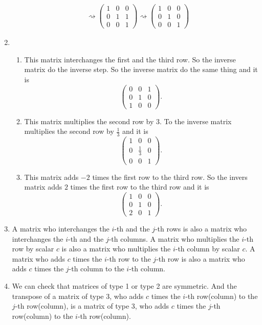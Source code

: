 \begin{enumerate}
\begin{align*}
&\rightsquigarrow\left(\begin{array}{ccc}1&0&0\\0&1&1\\0&0&1\end{array}\right)\rightsquigarrow\left(\begin{array}{ccc}1&0&0\\0&1&0\\0&0&1\end{array}\right)
\end{align*}
\item \begin{enumerate}
\item This matrix interchanges the first and the third row. So the inverse matrix do the inverse step. So the inverse matrix do the same thing and it is 
\[\left(\begin{array}{ccc}0&0&1\\0&1&0\\1&0&0\end{array}\right).\]
\item This matrix multiplies the second row by $3$. To the inverse matrix multiplies the second row by $\frac{1}{3}$ and it is 
\[\left(\begin{array}{ccc}1&0&0\\0&\frac{1}{3}&0\\0&0&1\end{array}\right).\]
\item This matrix adds $-2$ times the first row to the third row. So the invers matrix adds $2$ times the first row to the third row and it is 
\[\left(\begin{array}{ccc}1&0&0\\0&1&0\\2&0&1\end{array}\right).\]
\end{enumerate}
\item A matrix who interchanges the $i$-th and the $j$-th rows is also a matrix who interchanges the $i$-th and the $j$-th columns. A matrix who multiplies the $i$-th row by scalar $c$ is also a matrix who multiplies the $i$-th column by scalar $c$. A matrix who adds $c$ times the $i$-th row to the $j$-th row is also a matrix who adds $c$ times the $j$-th column to the $i$-th column.
\item We can check that matrices of type 1 or type 2 are symmetric. And the transpose of a matrix of type 3, who adds $c$ times the $i$-th row(column) to the $j$-th row(column), is a matrix of type 3, who adds $c$ times the $j$-th row(column) to the $i$-th row(column).

\end{enumerate}
